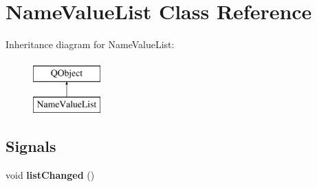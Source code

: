 \hypertarget{class_name_value_list}{}\section{Name\+Value\+List Class Reference}
\label{class_name_value_list}
Inheritance diagram for Name\+Value\+List\+:\begin{figure}[H]
\begin{center}
\leavevmode
\includegraphics[height=2.000000cm]{class_name_value_list}
\end{center}
\end{figure}
\subsection*{Signals}
\begin{DoxyCompactItemize}
\item 
\mbox{\label{class_name_value_list_a201e7e3d8f82ee140de5ccbff671cf24}} 
void {\bfseries list\+Changed} ()
\end{DoxyCompactItemize}
